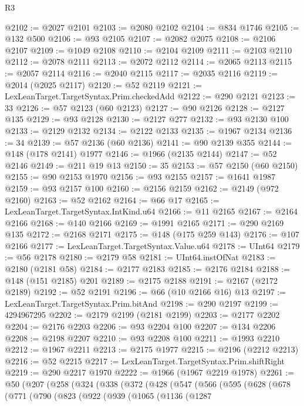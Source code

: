 \begin{lexlean}{R3}
\begin{coremodule}
@2102 := @2027 @2101
@2103 := @2080 @2102
@2104 := @834 @1746
@2105 := @132 @500
@2106 := @93 @2105
@2107 := @2082 @2075
@2108 := @2106 @2107
@2109 := @1049 @2108
@2110 := @2104 @2109
@2111 := @2103 @2110
@2112 := @2078 @2111
@2113 := @2072 @2112
@2114 := @2065 @2113
@2115 := @2057 @2114
@2116 := @2040 @2115
@2117 := @2035 @2116
@2119 := @2014 (@2025 @2117)
@2120 := @52 @2119
@2121 := LexLeanTarget.TargetSyntax.Prim.checkedAdd
@2122 := @290 @2121
@2123 := 33
@2126 := @57 @2123 (@60 @2123)
@2127 := @90 @2126
@2128 := @2127 @135
@2129 := @93 @2128
@2130 := @2127 @277
@2132 := @93 @2130 @100
@2133 := @2129 @2132
@2134 := @2122 @2133
@2135 := @1967 @2134
@2136 := 34
@2139 := @57 @2136 (@60 @2136)
@2141 := @90 @2139 @355
@2144 := @148 (@178 @2141) @1977
@2146 := @1966 (@2135 @2144)
@2147 := @52 @2146
@2149 := @211 @19 @13
@2150 := 35
@2153 := @57 @2150 (@60 @2150)
@2155 := @90 @2153 @1970
@2156 := @93 @2155
@2157 := @1641 @1987
@2159 := @93 @2157 @100
@2160 := @2156 @2159
@2162 := @2149 (@972 @2160)
@2163 := @52 @2162
@2164 := @66 @17
@2165 := LexLeanTarget.TargetSyntax.IntKind.u64
@2166 := @11 @2165
@2167 := @2164 @2166
@2168 := @140 @2166
@2169 := @1991 @2165
@2171 := @290 @2169 @135
@2172 := @2168 @2171
@2175 := @148 (@175 @259 @143)
@2176 := @107 @2166
@2177 := LexLeanTarget.TargetSyntax.Value.u64
@2178 := UInt64
@2179 := @56 @2178
@2180 := @2179 @58
@2181 := UInt64.instOfNat
@2183 := @2180 (@2181 @58)
@2184 := @2177 @2183
@2185 := @2176 @2184
@2188 := @148 (@151 @2185) @201
@2189 := @2175 @2188
@2191 := @2167 (@2172 @2189)
@2192 := @52 @2191
@2196 := @66 (@10 @2166 @16) @13
@2197 := LexLeanTarget.TargetSyntax.Prim.bitAnd
@2198 := @290 @2197
@2199 := 4294967295
@2202 := @2179 @2199 (@2181 @2199)
@2203 := @2177 @2202
@2204 := @2176 @2203
@2206 := @93 @2204 @100
@2207 := @134 @2206
@2208 := @2198 @2207
@2210 := @93 @2208 @100
@2211 := @1993 @2210
@2212 := @1967 @2211
@2213 := @2175 @1977
@2215 := @2196 (@2212 @2213)
@2216 := @52 @2215
@2217 := LexLeanTarget.TargetSyntax.Prim.shiftRight
@2219 := @290 @2217 @1970
@2222 := @1966 (@1967 @2219 @1978)
@2261 := @50
    (@207
      (@258
        (@324
          (@338
            (@372
              (@428
                (@547
                  (@566
                    (@595
                      (@628
                        (@678
                          (@771
                            (@790
                              (@823
                                (@922
                                  (@939
                                    (@1065
                                      (@1136
                                        (@1287

\end{coremodule}
\end{lexlean}
